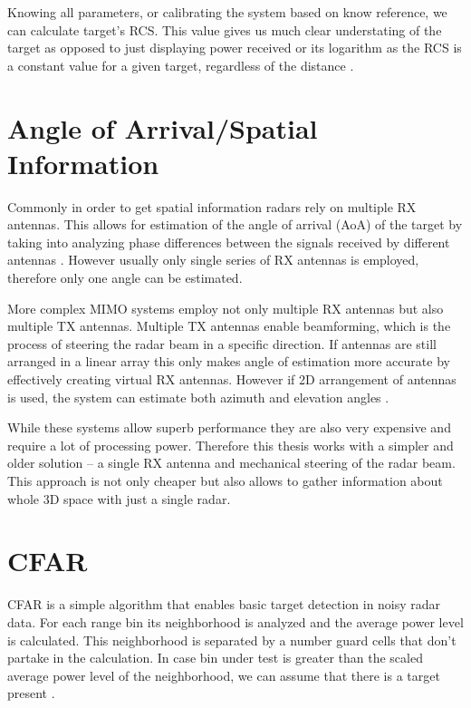 Knowing all parameters, or calibrating the system based on know reference, we can  calculate target's RCS.
This value gives us much clear understating of the target as opposed to just displaying power received or its logarithm as the RCS is a constant value for a given target, regardless of the distance \cite{richards2022}.

\section{Angle of Arrival/Spatial Information}

Commonly in order to get spatial information radars rely on multiple RX antennas.
This allows for estimation of the angle of arrival (AoA) of the target by taking into analyzing phase differences between the signals received by different antennas \cite{suleymanov2016}.
However usually only single series of RX antennas is employed, therefore only one angle can be estimated.

More complex MIMO systems employ not only multiple RX antennas but also multiple TX antennas.
Multiple TX antennas enable beamforming, which is the process of steering the radar beam in a specific direction.
If antennas are still arranged in a linear array this only makes angle of estimation more accurate by effectively creating virtual RX antennas.
However if 2D arrangement of antennas is used, the system can estimate both azimuth and elevation angles \cite{sandeep2018}.

While these systems allow superb performance they are also very expensive and require a lot of processing power.
Therefore this thesis works with a simpler and older solution -- a single RX antenna and mechanical steering of the radar beam.
This approach is not only cheaper but also allows to gather information about whole 3D space with just a single radar.

\section{CFAR}


CFAR is a simple algorithm that enables basic target detection in noisy radar data.
For each range bin its neighborhood is analyzed and the average power level is calculated.
This neighborhood is separated by a number guard cells that don't partake in the calculation.
In case bin under test is greater than the scaled average power level of the neighborhood, we can assume that there is a target present \cite{jankiraman2018}.

